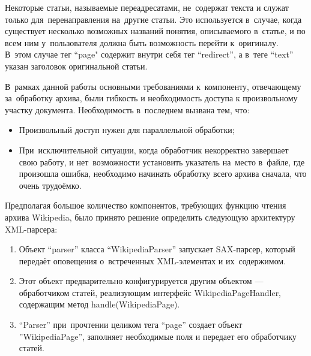 Некоторые статьи, называемые переадресатами, не~содержат текста и служат только для~перенаправления на~другие статьи. 
Это используется в~случае, когда существует несколько возможных названий понятия, 
описываемого в~статье, и по всем ним у~пользователя должна быть возможность перейти к~оригиналу.
В~этом случае тег ``page" содержит внутри себя тег ``redirect'', 
а в~теге ``text'' указан заголовок оригинальной статьи.

В~рамках данной работы основными требованиями к~компоненту, 
отвечающему за~обработку архива, были гибкость и необходимость доступа к произвольному участку документа.
Необходимость в~последнем вызвана тем, что:

\begin{itemize}

\item{
Произвольный доступ нужен для параллельной обработки;
}

\item{
При~исключительной ситуации, когда  обработчик некорректно завершает свою работу, 
и нет~возможности установить указатель на~место в~файле, где произошла ошибка,
необходимо начинать обработку всего архива сначала, что очень трудоёмко.
}

\end{itemize}

Предполагая большое количество компонентов, требующих функцию чтения архива Wikipedia,
было принято решение определить следующую архитектуру XML-парсера:

\begin{enumerate}

\item{
Объект ``parser'' класса ``WikipediaParser'' запускает SAX-парсер, 
который передаёт оповещения о~встреченных XML-элементах и их~содержимом.
}

\item {
Этот объект предварительно конфигурируется другим объектом --- обработчиком статей,
 реализующим интерфейс WikipediaPageHandler, 
содержащим метод handle(WikipediaPage).
}

\item{
``Parser'' при~прочтении целиком тега ``page'' создает объект ''WikipediaPage'', 
заполняет необходимые поля и передает его обработчику статей.
}

\end{enumerate}


